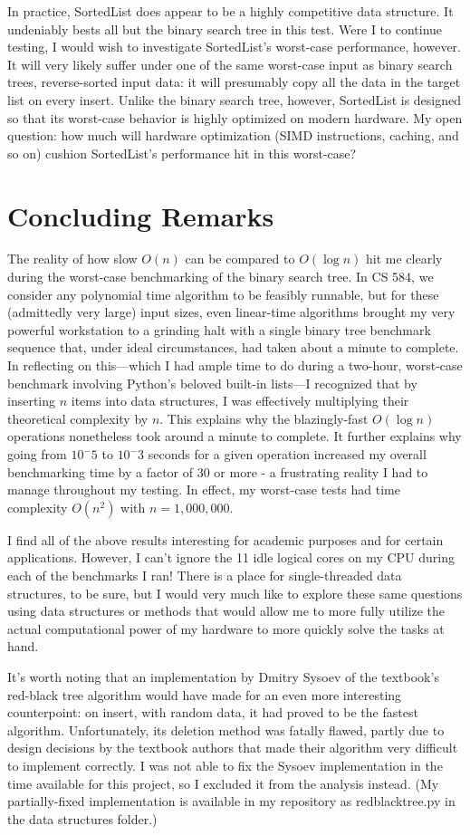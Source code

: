 \documentclass{article}
\begin{document}
In practice, SortedList does appear to be a highly competitive data structure. It undeniably bests all but the binary search tree in this test. Were I to continue testing, I would wish to investigate SortedList's worst-case performance, however. It will very likely suffer under one of the same worst-case input as binary search trees, reverse-sorted input data: it will presumably copy all the data in the target list on every insert. Unlike the binary search tree, however, SortedList is designed so that its worst-case behavior is highly optimized on modern hardware. My open question: how much will hardware optimization (SIMD instructions, caching, and so on) cushion SortedList's performance hit in this worst-case?

\section{Concluding Remarks}
The reality of how slow $O(n)$ can be compared to $O(\log n)$ hit me clearly during the worst-case benchmarking of the binary search tree. In CS 584, we consider any polynomial time algorithm to be feasibly runnable, but for these (admittedly very large) input sizes, even linear-time algorithms brought my very powerful workstation to a grinding halt with a single binary tree benchmark sequence that, under ideal circumstances, had taken about a minute to complete. In reflecting on this---which I had ample time to do during a two-hour, worst-case benchmark involving Python's beloved built-in lists---I recognized that by inserting $n$ items into data structures, I was effectively multiplying their theoretical complexity by $n$. This explains why the blazingly-fast $O(\log n)$ operations nonetheless took around a minute to complete. It further explains why going from $10^-5$ to $10^-3$ seconds for a given operation increased my overall benchmarking time by a factor of 30 or more - a frustrating reality I had to manage throughout my testing. In effect, my worst-case tests had time complexity $O(n^2)$ with $n = 1,000,000$.

I find all of the above results interesting for academic purposes and for certain applications. However, I can't ignore the 11 idle logical cores on my CPU during each of the benchmarks I ran! There is a place for single-threaded data structures, to be sure, but I would very much like to explore these same questions using data structures or methods that would allow me to more fully utilize the actual computational power of my hardware to more quickly solve the tasks at hand.

It's worth noting that an implementation by Dmitry Sysoev of the textbook's red-black tree algorithm would have made for an even more interesting counterpoint: on insert, with random data, it had proved to be the fastest algorithm. Unfortunately, its deletion method was fatally flawed, partly due to design decisions by the textbook authors that made their algorithm very difficult to implement correctly. I was not able to fix the Sysoev implementation in the time available for this project, so I excluded it from the analysis instead. (My partially-fixed implementation is available in my repository as redblacktree.py in the data structures folder.)
\end{document}
